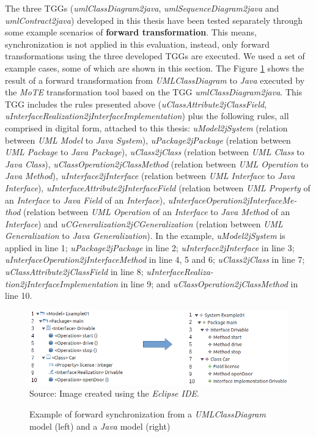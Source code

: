 \documentclass[tuberlin,cic,tc,english,noabntcite,oneside]{iiufrgs}
\begin{document}
The three TGGs (\emph{umlClassDiagram2java}, \emph{umlSequenceDiagram2java} and \emph{umlContract2java}) developed in this thesis have been tested separately through some example scenarios of \textbf{forward transformation}. This means, synchronization is not applied in this evaluation, instead, only forward transformations using the three developed TGGs are executed. We used a set of example cases, some of which are shown in this section. The Figure \ref{fig:umlClassDiagram2java_Example01} shows the result of a forward transformation from \emph{UMLClassDiagram} to \emph{Java} executed by the \emph{MoTE} transformation tool based on the TGG \emph{umlClassDiagram2java}. This TGG includes the rules presented above (\emph{uClassAttribute2jClassField}, \emph{uInterfaceRealization2jInterfaceImplementation}) plus the following rules, all comprised in digital form, attached to this thesis: \emph{uModel2jSystem} (relation between \emph{UML Model} to \emph{Java System}), \emph{uPackage2jPackage} (relation between \emph{UML Package} to \emph{Java Package}), \emph{uClass2jClass} (relation between \emph{UML Class} to \emph{Java Class}), \emph{uClassOperation2jClassMethod} (relation between \emph{UML Operation} to \emph{Java Method}), \emph{uInterface2jInterface} (relation between \emph{UML Interface} to \emph{Java Interface}), \emph{uInterfaceAttribute2jInterfaceField} (relation between \emph{UML Property} of an \emph{Interface} to \emph{Java Field} of an \emph{Interface}), \emph{uInterfaceOperation2jInterfaceMe- thod} (relation between \emph{UML Operation} of an \emph{Interface} to \emph{Java Method} of an \emph{Interface}) and \emph{uCGeneralization2jCGeneralization} (relation between \emph{UML Generalization} to \emph{Java Generalization}). In the example, \emph{uModel2jSystem} is applied in line 1; \emph{uPackage2jPackage} in line 2; \emph{uInterface2jInterface} in line 3; \emph{uInterfaceOperation2jInterfaceMethod} in line 4, 5 and 6; \emph{uClass2jClass} in line 7; \emph{uClassAttribute2jClassField} in line 8;  \emph{uInterfaceRealiza- tion2jInterfaceImplementation} in line 9; and \emph{uClassOperation2jClassMethod} in line 10.

\begin{figure}[H]
	\centering
    \caption{Example of forward synchronization from a \emph{UMLClassDiagram} model (left) and a \emph{Java} model (right)}
    \includegraphics[width=.9\textwidth]{umlClassDiagram2java_Example01} \\
    Source: Image created using the \emph{Eclipse IDE}.
    \label{fig:umlClassDiagram2java_Example01}
\end{figure}
\end{document}
